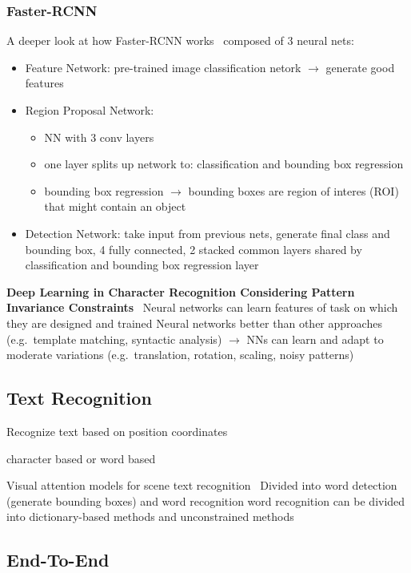 \subsubsection*{Faster-RCNN}
A deeper look at how Faster-RCNN works~\citep{goswami_deeper_2018}
composed of 3 neural nets:
\begin{itemize}
    \item Feature Network: pre-trained image classification netork $\rightarrow$ generate good features
    \item Region Proposal Network:
        \begin{itemize}
            \item NN with 3 conv layers
            \item one layer splits up network to: classification and bounding box regression
            \item bounding box regression $\rightarrow$ bounding boxes are region of interes (ROI)
                that might contain an object
        \end{itemize}
    \item Detection Network: take input from previous nets, generate final class and bounding box,
        4 fully connected, 2 stacked common layers shared by classification and bounding box regression
        layer \end{itemize}

\textbf{Deep Learning in Character Recognition Considering Pattern Invariance
Constraints}~\citep{oyedotun_deep_2015}
Neural networks can learn features of task on which they are designed and trained
Neural networks better than other approaches (e.g.\ template matching, syntactic analysis)
$\rightarrow$ NNs can learn and adapt to moderate variations (e.g.\ translation, rotation, scaling,
noisy patterns)

\subsection*{Text Recognition}
Recognize text based on position coordinates

character based or word based

Visual attention models for scene text recognition~\citep{ghosh_visual_2017}
Divided into word detection (generate bounding boxes) and word recognition
word recognition can be divided into dictionary-based methods and unconstrained methods

\subsection*{End-To-End}
